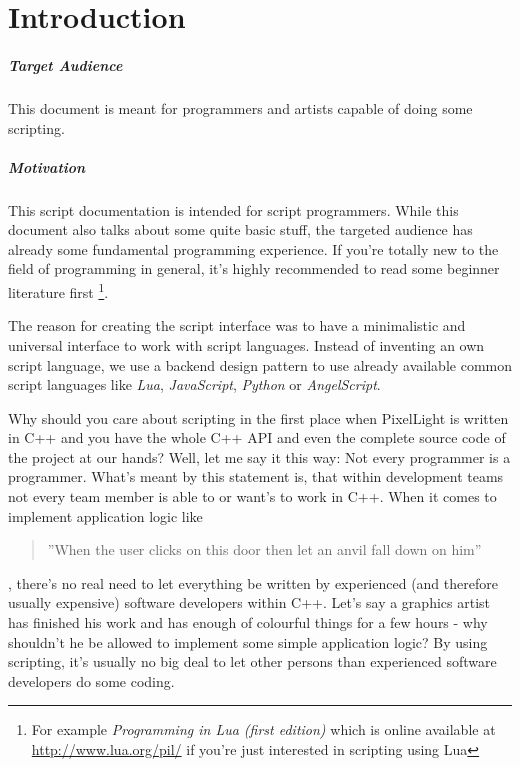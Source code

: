 \chapter{Introduction}


\paragraph{Target Audience}
This document is meant for programmers and artists capable of doing some scripting.


\paragraph{Motivation}
This script documentation is intended for script programmers. While this document also talks about some quite basic stuff, the targeted audience has already some fundamental programming experience. If you're totally new to the field of programming in general, it's highly recommended to read some beginner literature first \footnote{For example \emph{Programming in Lua (first edition)} which is online available at \url{http://www.lua.org/pil/} if you're just interested in scripting using Lua}.

The reason for creating the script interface was to have a minimalistic and universal interface to work with script languages. Instead of inventing an own script language, we use a backend design pattern to use already available common script languages like \emph{Lua}, \emph{JavaScript}, \emph{Python} or \emph{AngelScript}.

Why should you care about scripting in the first place when PixelLight is written in C++ and you have the whole C++ \ac{API} and even the complete source code of the project at our hands? Well, let me say it this way: Not every programmer is a programmer. What's meant by this statement is, that within development teams not every team member is able to or want's to work in C++. When it comes to implement application logic like \begin{quote}''When the user clicks on this door then let an anvil fall down on him''\end{quote}, there's no real need to let everything be written by experienced (and therefore usually expensive) software developers within C++. Let's say a graphics artist has finished his work and has enough of colourful things for a few hours - why shouldn't he be allowed to implement some simple application logic? By using scripting, it's usually no big deal to let other persons than experienced software developers do some coding.




